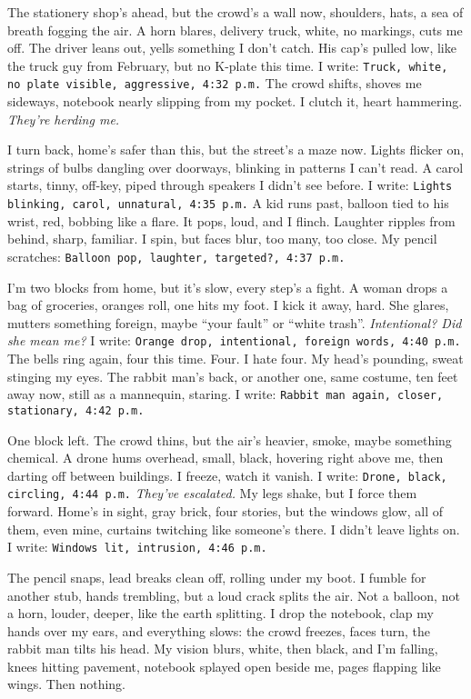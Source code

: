 \documentclass[12pt,oneside]{book} %
\newcommand{\note}[1]{\texttt{#1}}
\begin{document}
The stationery shop’s ahead, but the crowd’s a wall now, shoulders, hats, a sea of breath fogging the air. A horn blares, delivery truck, white, no markings, cuts me off. The driver leans out, yells something I don’t catch. His cap’s pulled low, like the truck guy from February, but no K-plate this time. I write: \note{Truck, white, no plate visible, aggressive, 4:32 p.m.} The crowd shifts, shoves me sideways, notebook nearly slipping from my pocket. I clutch it, heart hammering. \textit{They’re herding me.} 

I turn back, home’s safer than this, but the street’s a maze now. Lights flicker on, strings of bulbs dangling over doorways, blinking in patterns I can’t read. A carol starts, tinny, off-key, piped through speakers I didn’t see before. I write: \note{Lights blinking, carol, unnatural, 4:35 p.m.} A kid runs past, balloon tied to his wrist, red, bobbing like a flare. It pops, loud, and I flinch. Laughter ripples from behind, sharp, familiar. I spin, but faces blur, too many, too close. My pencil scratches: \note{Balloon pop, laughter, targeted?, 4:37 p.m.}

I’m two blocks from home, but it’s slow, every step’s a fight. A woman drops a bag of groceries, oranges roll, one hits my foot. I kick it away, hard. She glares, mutters something foreign, maybe “your fault” or “white trash”. \textit{Intentional? Did she mean me?} I write: \note{Orange drop, intentional, foreign words, 4:40 p.m.} The bells ring again, four this time. Four. I hate four. My head’s pounding, sweat stinging my eyes. The rabbit man’s back, or another one, same costume, ten feet away now, still as a mannequin, staring. I write: \note{Rabbit man again, closer, stationary, 4:42 p.m.}

One block left. The crowd thins, but the air’s heavier, smoke, maybe something chemical. A drone hums overhead, small, black, hovering right above me, then darting off between buildings. I freeze, watch it vanish. I write: \note{Drone, black, circling, 4:44 p.m.} \textit{They’ve escalated.} My legs shake, but I force them forward. Home’s in sight, gray brick, four stories, but the windows glow, all of them, even mine, curtains twitching like someone’s there. I didn’t leave lights on. I write: \note{Windows lit, intrusion, 4:46 p.m.}

The pencil snaps, lead breaks clean off, rolling under my boot. I fumble for another stub, hands trembling, but a loud crack splits the air. Not a balloon, not a horn, louder, deeper, like the earth splitting. I drop the notebook, clap my hands over my ears, and everything slows: the crowd freezes, faces turn, the rabbit man tilts his head. My vision blurs, white, then black, and I’m falling, knees hitting pavement, notebook splayed open beside me, pages flapping like wings. Then nothing.
\end{document}
